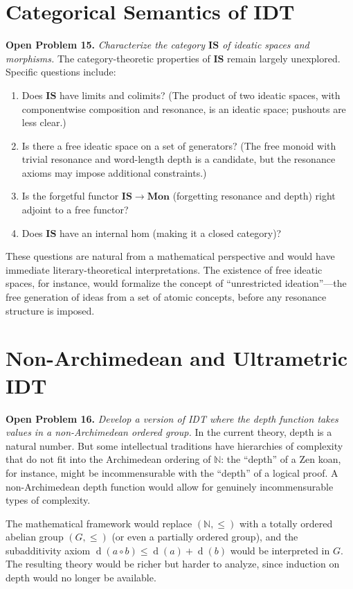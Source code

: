 \documentclass[11pt,openany]{book}
\theoremstyle{definition}
\theoremstyle{plain}
\theoremstyle{remark}
\newcommand{\compose}{\circ}                 %
\newcommand{\depth}{\operatorname{d}}       %
\begin{document}
\section{Categorical Semantics of IDT}

\textbf{Open Problem 15.} \emph{Characterize the category $\mathbf{IS}$ of ideatic spaces and morphisms.} The category-theoretic properties of $\mathbf{IS}$ remain largely unexplored. Specific questions include:
\begin{enumerate}
\item Does $\mathbf{IS}$ have limits and colimits? (The product of two ideatic spaces, with componentwise composition and resonance, is an ideatic space; pushouts are less clear.)
\item Is there a free ideatic space on a set of generators? (The free monoid with trivial resonance and word-length depth is a candidate, but the resonance axioms may impose additional constraints.)
\item Is the forgetful functor $\mathbf{IS} \to \mathbf{Mon}$ (forgetting resonance and depth) right adjoint to a free functor?
\item Does $\mathbf{IS}$ have an internal hom (making it a closed category)?
\end{enumerate}

These questions are natural from a mathematical perspective and would have immediate literary-theoretical interpretations. The existence of free ideatic spaces, for instance, would formalize the concept of ``unrestricted ideation''---the free generation of ideas from a set of atomic concepts, before any resonance structure is imposed.

\section{Non-Archimedean and Ultrametric IDT}

\textbf{Open Problem 16.} \emph{Develop a version of IDT where the depth function takes values in a non-Archimedean ordered group.} In the current theory, depth is a natural number. But some intellectual traditions have hierarchies of complexity that do not fit into the Archimedean ordering of $\mathbb{N}$: the ``depth'' of a Zen koan, for instance, might be incommensurable with the ``depth'' of a logical proof. A non-Archimedean depth function would allow for genuinely incommensurable types of complexity.

The mathematical framework would replace $(\mathbb{N}, \leq)$ with a totally ordered abelian group $(G, \leq)$ (or even a partially ordered group), and the subadditivity axiom $\depth(a \compose b) \leq \depth(a) + \depth(b)$ would be interpreted in $G$. The resulting theory would be richer but harder to analyze, since induction on depth would no longer be available.
\end{document}
